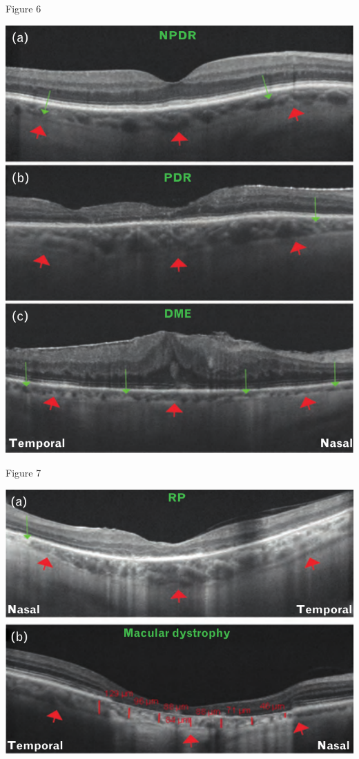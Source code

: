 \documentclass{beamer}
\begin{document}
\begin{frame}{Figure 6}
    \begin{center}
        \includegraphics[height=0.8\textheight]{6.png}
    \end{center}
\end{frame}

\begin{frame}{Figure 7}
    \begin{center}
        \includegraphics[height=0.8\textheight]{7.png}
    \end{center}
\end{frame}
\end{document}
